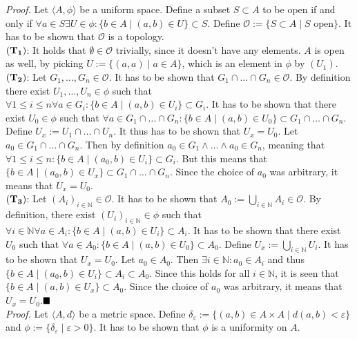 \textit{Proof.}
Let $\langle A,\phi\rangle$ be a uniform space. Define a subset $S\subset A$ to be open if and only if $\forall a\in S\exists U\in\phi:\{b\in A\mid (a,b)\in U\}\subset S$. Define $\mathcal{O}:=\{S\subset A\mid S\text{ open}\}$. It has to be shown that $\mathcal{O}$ is a topology.\\

${\bf (T_1)}$: It holds that $\emptyset\in\mathcal{O}$ trivially, since it doesn't have any elements. $A$ is open as well, by picking $U:=\{(a,a)\mid a\in A\}$, which is an element in $\phi$ by $(U_1)$.\\

${\bf (T_2)}$: Let $G_1,\hdots,G_n\in\mathcal{O}$. It has to be shown that $G_1\cap\hdots\cap G_n\in\mathcal{O}$. By definition there exist $U_1,\hdots,U_n\in\phi$ such that $\forall 1\leq i\leq n\forall a\in G_i: \{b\in A\mid (a,b)\in U_i\}\subset G_i$. It has to be shown that there exist $U_0\in\phi$ such that $\forall a\in G_1\cap\hdots\cap G_n: \{b\in A\mid (a,b)\in U_0\}\subset G_1\cap\hdots\cap G_n$. Define $U_x:=U_1\cap\hdots\cap U_n$. It thus has to be shown that $U_x=U_0$. Let $a_0\in G_1\cap\hdots\cap G_n$. Then by definition $a_0\in G_1\land\hdots\land a_0\in G_n$, meaning that $\forall 1\leq i\leq n: \{b\in A\mid (a_0,b)\in U_i\}\subset G_i$. But this means that $\{b\in A\mid (a_0,b)\in U_x\}\subset G_1\cap\hdots\cap G_n$. Since the choice of $a_0$ was arbitrary, it means that $U_x=U_0$.\\

${\bf (T_3)}$: Let $(A_i)_{i\in\mathbb{N}}\in\mathcal{O}$. It has to be shown that $A_0:=\bigcup_{i\in\mathbb{N}}A_i\in\mathcal{O}$. By definition, there exist $(U_i)_{i\in\mathbb{N}}\in\phi$ such that $\forall i\in\mathbb{N}\forall a\in A_i:\{b\in A\mid (a,b)\in U_i\}\subset A_i$. It has to be shown that there exist $U_0$ such that $\forall a\in A_0:\{b\in A\mid (a,b)\in U_0\}\subset A_0$. Define $U_x:=\bigcup_{i\in\mathbb{N}}U_i$. It has to be shown that $U_x=U_0$. Let $a_0\in A_0$. Then $\exists i\in\mathbb{N}: a_0\in A_i$ and thus $\{b\in A\mid (a_0,b)\in U_i\}\subset A_i\subset A_0$. Since this holds for all $i\in\mathbb{N}$, it is seen that $\{b\in A\mid (a,b)\in U_x\}\subset A_0$. Since the choice of $a_0$ was arbitrary, it means that $U_x=U_0$.$\qed$\\

\textit{Proof.}
Let $\langle A,d\rangle$ be a metric space. Define $\delta_\varepsilon:=\{(a,b)\in A\times A\mid d(a,b)<\varepsilon\}$ and $\phi:=\{\delta_\varepsilon\mid \varepsilon>0\}$. It has to be shown that $\phi$ is a uniformity on $A$.\\


